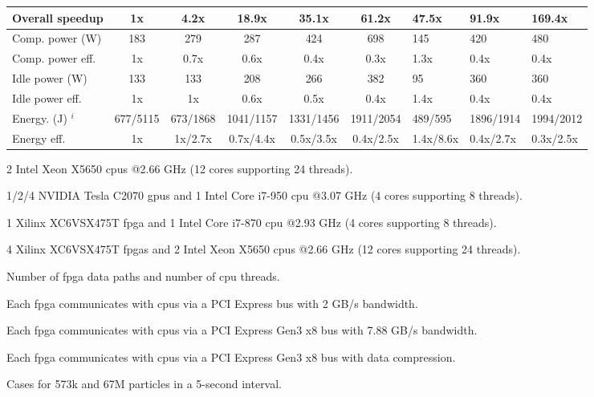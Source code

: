 \begin{table}[h]
\begin{spacing}{1.0}
\begin{threeparttable}
\begin{tabular}{l || c c c c c g g g}
		Overall speedup  						& 1x							& 4.2x	 					& 18.9x						& 35.1x						& 61.2x						& 47.5x 	& 91.9x		& 169.4x	\\
		\hline
		Comp. power (W) 	   					& 183							& 279 						& 287  						& 424						& 698						& 145 		& 420		& 480		\\
		Comp. power eff.						& 1x							& 0.7x						& 0.6x 						& 0.4x						& 0.3x						& 1.3x 		& 0.4x 		& 0.4x		\\
		Idle power (W)    						& 133							& 133						& 208   					& 266 						& 382						& 95		& 360		& 360		\\
		Idle power eff.					    	& 1x							& 1x						& 0.6x	 					& 0.5x						& 0.4x						& 1.4x 	& 0.4x		& 0.4x		\\
		\hline
		Energy. (J) $^i$						& 677/5115						& 673/1868 					& 1041/1157 				& 1331/1456					& 1911/2054					& 489/595 	& 1896/1914	& 1994/2012	\\
		Energy eff.								& 1x							& 1x/2.7x 					& 0.7x/4.4x 				& 0.5x/3.5x 				& 0.4x/2.5x					& 1.4x/8.6x	& 0.4x/2.7x	& 0.3x/2.5x\\
		\hline
		\end{tabular}
			\begin{tablenotes}
			\item[a] 2 Intel Xeon X5650 \gls{cpu}s @2.66 GHz (12 cores supporting 24 threads).
			\item[b] 1/2/4 NVIDIA Tesla C2070 \gls{gpu}s and 1 Intel Core i7-950 \gls{cpu} @3.07 GHz (4 cores supporting 8 threads).
			\item[c] 1 Xilinx XC6VSX475T \gls{fpga} and 1 Intel Core i7-870 \gls{cpu} @2.93 GHz (4 cores supporting 8 threads).
			\item[d] 4 Xilinx XC6VSX475T \gls{fpga}s and 2 Intel Xeon X5650 \gls{cpu}s @2.66 GHz (12 cores supporting 24 threads).
			\item[e] Number of \gls{fpga} data paths and number of \gls{cpu} threads.
			\item[f] Each \gls{fpga} communicates with \gls{cpu}s via a PCI Express bus with 2 GB/s bandwidth.
			\item[g] Each \gls{fpga} communicates with \gls{cpu}s via a PCI Express Gen3 x8 bus with 7.88 GB/s bandwidth.
			\item[h] Each \gls{fpga} communicates with \gls{cpu}s via a PCI Express Gen3 x8 bus with data compression.
			\item[i] Cases for 573k and 67M particles in a 5-second interval.
			\end{tablenotes}
		\end{threeparttable}
\end{spacing}
\end{table}

